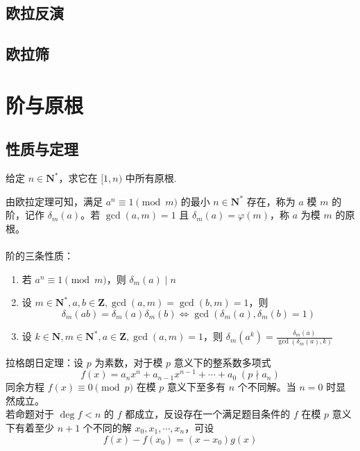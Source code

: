\documentclass[12pt,a4paper]{article}
\begin{document}
\subsection{欧拉反演}
\subsection{欧拉筛}

\newpage
\section{阶与原根}
\subsection{性质与定理}
\begin{mdframed}[leftline=true, linewidth=2pt, linecolor=gray]
	给定 $n\in\mathbf{N^*}$，求它在 $[1,n)$ 中所有原根.
\end{mdframed}
由欧拉定理可知，满足 $a^n\equiv1\pmod m$ 的最小 $n\in\mathbf{N^*}$ 存在，称为 $a$ 模 $m$ 的阶，记作 $\delta_m(a)$。若 $\gcd(a,m)=1$ 且 $\delta_m(a)=\varphi(m)$，称 $a$ 为模 $m$ 的原根。\\
\\
阶的三条性质：
\begin{enumerate}
	\item 若 $a^n\equiv 1\pmod m$，则 $\delta_m{(a)}\mid n$
	\item 设 $m\in \mathbf{N}^*,a,b\in\mathbf{Z},\gcd(a,m)=\gcd(b,m)=1$，则 \begin{equation*}
		\delta_m(ab)=\delta_m(a)\delta_m(b)\iff \gcd(\delta_m(a),\delta_m(b)=1)
	\end{equation*}
	\item 设 $k\in\mathbf{N},m\in\mathbf{N^*},a\in\mathbf{Z}, \gcd(a,m)=1$，则 $\displaystyle\delta_m(a^k)=\frac{\delta_m(a)}{\gcd(\delta_m(a),k)}$
\end{enumerate}
拉格朗日定理：设 $p$ 为素数，对于模 $p$ 意义下的整系数多项式 
\begin{equation*}
	f(x)=a_nx^n+a_{n-1}x^{n-1}+\cdots+a_0\;(p\nmid a_n)
\end{equation*}
同余方程 $f(x)\equiv 0\pmod p$ 在模 $p$ 意义下至多有 $n$ 个不同解。当 $n=0$ 时显然成立。\\若命题对于 $\deg f< n$ 的 $f$ 都成立，反设存在一个满足题目条件的 $f$ 在模 $p$ 意义下有着至少 $n+1$ 个不同的解 $x_0,x_1,\cdots,x_{n}$，可设
\begin{equation*}
	f(x)-f(x_0)=(x-x_0)g(x)
\end{equation*}
\end{document}
